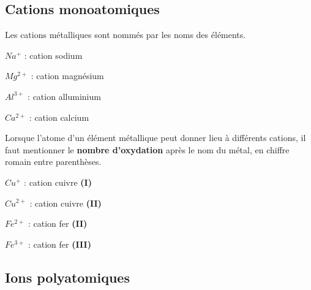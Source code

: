 \documentclass[
  11pt,
  a4paper,
  openany]{book}
\begin{document}
\newpage

\hypertarget{cations-monoatomiques}{%
\subsection{Cations monoatomiques}\label{cations-monoatomiques}}

Les cations métalliques sont nommés par les noms des éléments.

\begin{multicols}{3}
\(Na^+\) : cation sodium

\(Mg^{2+}\) : cation magnésium

\(Al^{3+}\) : cation alluminium

\(Ca^{2+}\) : cation calcium

\end{multicols}

Lorsque l'atome d'un élément métallique peut donner lieu à différents cations, il faut mentionner le \textbf{nombre d'oxydation} après le nom du métal, en chiffre romain entre parenthèses.

\begin{multicols}{3}
\(Cu^+\) : cation cuivre \textbf{(I)}

\(Cu^{2+}\) : cation cuivre \textbf{(II)}

\(Fe^{2+}\) : cation fer \textbf{(II)}

\(Fe^{3+}\) : cation fer \textbf{(III)}

\end{multicols}

\hypertarget{ions-polyatomiques}{%
\subsection{Ions polyatomiques}\label{ions-polyatomiques}}
\end{document}
